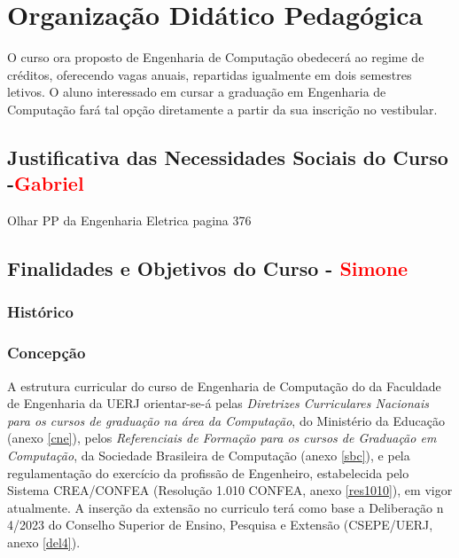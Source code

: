 
\chapter{Organização Didático Pedagógica}

O curso ora proposto de Engenharia de Computação obedecerá ao regime de créditos, oferecendo \vagas vagas anuais, repartidas igualmente em dois semestres letivos. O aluno interessado em cursar a graduação em Engenharia de Computação fará tal opção diretamente a partir da sua inscrição no vestibular.




\section{Justificativa das Necessidades Sociais do Curso -\textcolor{red}{Gabriel}}

Olhar PP da Engenharia Eletrica pagina 376

\section{Finalidades e Objetivos do Curso - \textcolor{red}{Simone}}

\subsection{Histórico}

\subsection{Concepção}

A estrutura curricular do curso de Engenharia de Computação do \desc da Faculdade de Engenharia da UERJ orientar-se-á pelas \textit{Diretrizes Curriculares Nacionais para os cursos de graduação na área da Computação}, do Ministério da Educação (anexo \ref{cne}), pelos \textit{Referenciais de Formação para os cursos de Graduação em Computação}, da Sociedade Brasileira de Computação (anexo \ref{sbc}), e pela regulamentação do exercício da profissão de Engenheiro, estabelecida pelo Sistema CREA/CONFEA (Resolução 1.010 CONFEA, anexo \ref{res1010}), em vigor atualmente. A inserção da extensão no curriculo terá como base a Deliberação n\textordmasculine{} 4/2023 do Conselho Superior de Ensino, Pesquisa e Extensão (CSEPE/UERJ, anexo \ref{del4}).

